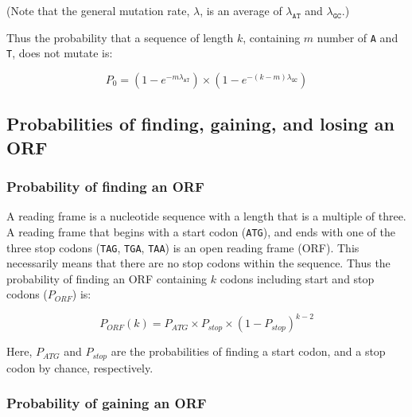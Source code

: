 \documentclass[12pt,a4paper]{article}
\begin{document}
(Note that the general mutation rate, $\lambda$, is an average of $\lambda_\texttt{AT}$ and $\lambda_\texttt{GC}$.)

\vspace{1\baselineskip}

Thus the probability that a sequence of length $k$, containing $m$ number of \texttt{A} and \texttt{T}, does not mutate is:

\vspace{-1ex}

$$P_0 = (1-e^{-m\lambda_\texttt{AT}})\times(1-e^{-(k-m)\lambda_\texttt{GC}})$$


\subsection{Probabilities of finding, gaining, and losing an ORF}

\label{methORF}

\subsubsection{Probability of finding an ORF}

A reading frame is a nucleotide sequence with a length that is a multiple of three. A reading frame that begins with a start codon (\texttt{ATG}), and ends with one of the three stop codons (\texttt{TAG}, \texttt{TGA}, \texttt{TAA}) is an open reading frame (ORF). This necessarily means that there are no stop codons within the sequence. Thus the probability of finding an ORF containing $k$ codons including start and stop codons ($P_\textit{ORF}$) is: 

\begin{equation}
P_\textit{ORF}(k) = P_\textit{ATG} \times P_\textit{stop} \times (1 - P_\textit{stop})^{k-2}
\label{eqorfprob}
\end{equation}

Here, $P_\textit{ATG}$ and $P_\textit{stop}$ are the probabilities of finding a start codon, and a stop codon by chance, respectively.

\subsubsection{Probability of gaining an ORF}
\end{document}
